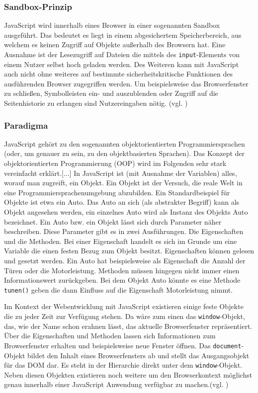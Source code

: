 \subsubsection{Sandbox-Prinzip} JavaScript wird innerhalb eines Browser in einer sogenannten Sandbox ausgeführt. Das bedeutet es liegt in einem abgesichertem Speicherbereich, aus welchem es keinen Zugriff auf Objekte außerhalb des Browsern hat. Eine Ausnahme ist der Lesezugriff auf Dateien die mittels des \texttt{input}-Elements von einem Nutzer selbst hoch geladen werden. Des Weiteren kann mit JavaScript auch nicht ohne weiteres auf bestimmte sicherheitskritische Funktionen des ausführenden Browser zugegriffen werden. Um beispielsweise das Browserfenster zu schließen, Symbolleisten ein- und auszublenden oder Zugriff auf die Seitenhistorie zu erlangen sind Nutzereingaben nötig. (vgl. \cite{WikiJS2014})

\subsubsection{Paradigma} \glqq JavaScript gehört zu den sogenannten objektorientierten Programmiersprachen (oder, um genauer zu sein, zu den objektbasierten Sprachen). Das Konzept der objektorientierten Programmierung (OOP) wird im Folgenden sehr stark vereinfacht erklärt.[...] In JavaScript ist (mit Ausnahme der Variablen) alles, worauf man zugreift, ein Objekt. Ein Objekt ist der Versuch, die reale Welt in eine Programmiersprachenumgebung abzubilden. Ein Standardbeispiel für Objekte ist etwa ein Auto. Das Auto an sich (als abstrakter Begriff) kann als Objekt angesehen werden, ein einzelnes Auto wird als Instanz des Objekts Auto bezeichnet.\grqq{}\cite[S.93]{WenzJava2008} Ein Auto bzw. ein Objekt lässt sich durch Parameter näher beschreiben. Diese Parameter gibt es in zwei Ausführungen. Die Eigenschaften und die Methoden. Bei einer Eigenschaft handelt es sich im Grunde um eine Variable die einen festen Bezug zum Objekt besitzt. Eigenschaften können gelesen und gesetzt werden. Ein Auto hat beispielsweise als Eigenschaft die Anzahl der Türen oder die Motorleistung. Methoden müssen hingegen nicht immer einen Informationswert zurückgeben. Bei dem Objekt Auto könnte es eine Methode \texttt{tunen()} geben die dann Einfluss auf die Eigenschaft Motorleistung nimmt.\par Im Kontext der Webentwicklung mit JavaScript existieren einige feste Objekte die zu jeder Zeit zur Verfügung stehen. Da wäre zum einen das \texttt{window}-Objekt, das, wie der Name schon erahnen lässt, das aktuelle Browserfenster repräsentiert. Über die Eigenschaften und Methoden lassen sich Informationen zum Browserfenster erhalten und beispielsweise neue Fenster öffnen. Das \texttt{document}-Objekt bildet den Inhalt eines Browserfensters ab und stellt das Ausgangsobjekt für das DOM dar. Es steht in der Hierarchie direkt unter dem \texttt{window}-Objekt. Neben diesen Objekten existieren noch weitere um den Browserkontext möglichst genau innerhalb einer JavaScript Anwendung verfügbar zu machen.(vgl. \cite{SelfHtml20147})

